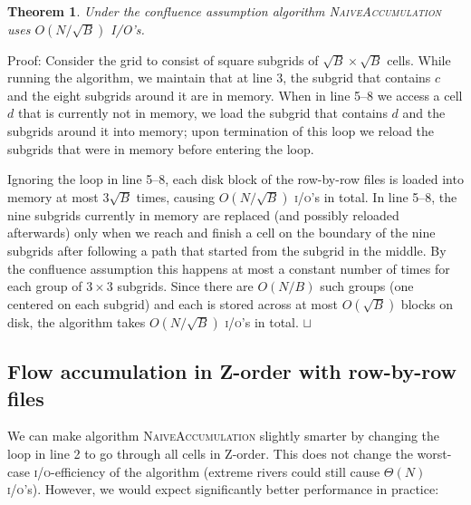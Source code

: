 \documentclass[10pt,a4paper]{article}
\newtheorem{theorem}{Theorem}
\newenvironment{proof}{Proof:}{\qed}
\def\squareforqed{\hbox{\rlap{$\sqcap$}$\sqcup$}}
\def\qed{\ifmmode\squareforqed\else{\unskip\nobreak\hfil
\penalty50\hskip1em\null\nobreak\hfil\squareforqed
\parfillskip=0pt\finalhyphendemerits=0\endgraf}\fi}
\def\io{\textsc{i/o}\xspace}
\def\ios{\textsc{i/o}'s\xspace}
\begin{document}
\begin{theorem}\label{NaiveAccumulationRonR}
Under the confluence assumption algorithm \textsc{NaiveAccumulation} uses $O(N/\sqrt B)$ I/O's.
\end{theorem}
\begin{proof}
Consider the grid to consist of square subgrids of $\sqrt{B} \times \sqrt{B}$ cells.
While running the algorithm, we maintain that at line 3, the subgrid that contains $c$ and the eight subgrids around it are in memory. When in line 5--8 we access a cell $d$ that is currently not in memory, we load the subgrid that contains $d$ and the subgrids around it into memory; upon termination of this loop we reload the subgrids that were in memory before entering the loop.

Ignoring the loop in line 5--8, each disk block of the row-by-row files is loaded into memory at most $3\sqrt{B}$ times, causing $O(N/\sqrt B)$ \ios in total. In line 5--8, the nine subgrids currently in memory are replaced (and possibly reloaded afterwards) only when we reach and finish a cell on the boundary of the nine subgrids after following a path that started from the subgrid in the middle. By the confluence assumption this happens at most a constant number of times for each group of $3 \times 3$ subgrids. Since there are $O(N/B)$ such groups (one centered on each subgrid) and each is stored across at most $O(\sqrt B)$ blocks on disk, the algorithm takes $O(N/\sqrt B)$ \ios in total.
\end{proof}

\subsection{Flow accumulation in Z-order with row-by-row files}

We can make algorithm \textsc{NaiveAccumulation} slightly smarter by changing the loop in line 2 to go through all cells in Z-order. This does not change the worst-case \io-efficiency of the algorithm (extreme rivers could still cause $\Theta(N)$ \ios). However, we would expect significantly better performance in practice:
\end{document}
